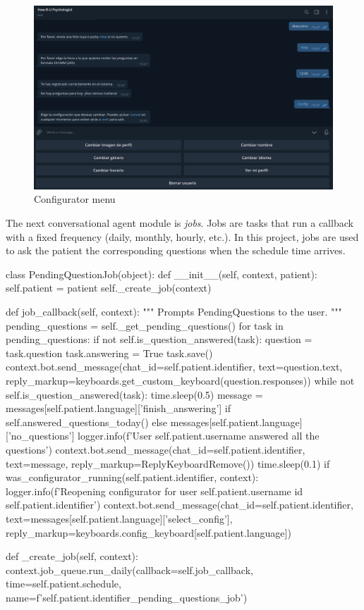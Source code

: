 \documentclass[12pt,english]{article}
\begin{document}
\begin{figure}[H]
  \centering
    \includegraphics[width=\textwidth]{config_menu.png}
  \caption{Configurator menu}
\end{figure}

The next conversational agent module is \emph{jobs}. Jobs are tasks that run a callback with a fixed frequency (daily, monthly, hourly, etc.). In this project, jobs are used to ask the patient the corresponding questions when the schedule time arrives.

\begin{python}[caption={PendingQuestion job}, captionpos=b]
class PendingQuestionJob(object):
  def __init__(self, context, patient):
      self.patient = patient
      self._create_job(context)

  def job_callback(self, context):
      """
      Prompts PendingQuestions to the user.
      """
      pending_questions = self._get_pending_questions()
      for task in pending_questions:
          if not self.is_question_answered(task):
              question = task.question
              task.answering = True
              task.save()
              context.bot.send_message(chat_id=self.patient.identifier, text=question.text, reply_markup=keyboards.get_custom_keyboard(question.responses))
              while not self.is_question_answered(task):
                  time.sleep(0.5)
      message = messages[self.patient.language]['finish_answering'] if self.answered_questions_today() else messages[self.patient.language]['no_questions']
      logger.info(f'User {self.patient.username} answered all the questions')
      context.bot.send_message(chat_id=self.patient.identifier, text=message, reply_markup=ReplyKeyboardRemove())
      time.sleep(0.1)
      if was_configurator_running(self.patient.identifier, context):
          logger.info(f'Reopening configurator for user {self.patient.username} id {self.patient.identifier}')
          context.bot.send_message(chat_id=self.patient.identifier,  text=messages[self.patient.language]['select_config'], reply_markup=keyboards.config_keyboard[self.patient.language])

  def _create_job(self, context):
      context.job_queue.run_daily(callback=self.job_callback, time=self.patient.schedule, name=f'{self.patient.identifier}_pending_questions_job')
\end{python}
\end{document}
